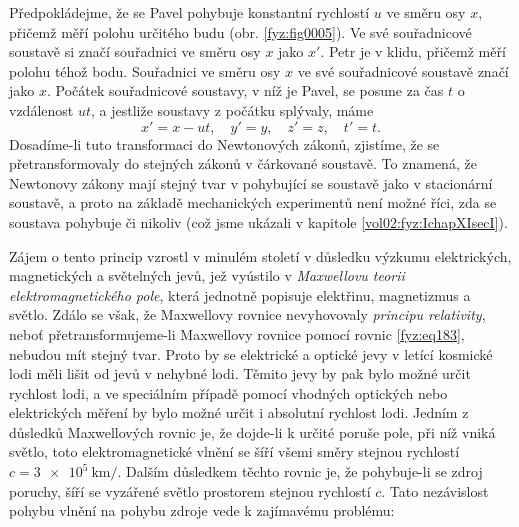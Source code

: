   
    Předpokládejme, že se Pavel pohybuje konstantní rychlostí \(u\) ve směru osy \(x\), přičemž měří
    polohu určitého budu (obr. \ref{fyz:fig0005}). Ve své souřadnicové soustavě si značí souřadnici
    ve směru osy \(x\) jako \(x'\). Petr je v klidu, přičemž měří polohu téhož bodu. Souřadnici ve
    směru osy \(x\) ve své souřadnicové soustavě značí jako \(x\). Počátek souřadnicové soustavy, v
    níž je Pavel, se posune za čas \(t\) o vzdálenost \(ut\), a jestliže soustavy z počátku
    splývaly, máme
    \begin{equation}\label{fyz:eq183}
      x' = x - ut, \quad y' = y, \quad z' = z, \quad t' = t. 
    \end{equation}
    Dosadíme-li tuto transformaci do Newtonových zákonů, zjistíme, že se přetransformovaly do
    stejných zákonů v čárkované soustavě. To znamená, že Newtonovy zákony mají stejný tvar v
    pohybující se soustavě jako v stacionární soustavě, a proto na základě mechanických experimentů
    není možné říci, zda se soustava pohybuje či nikoliv (což jsme ukázali v kapitole
    \ref{vol02:fyz:IchapXIsecI}). 
    
    Zájem o tento princip vzrostl v minulém století v důsledku výzkumu elektrických, magnetických a
    světelných jevů, jež vyústilo v \emph{Maxwellovu teorii elektromagnetického pole}, která
    jednotně popisuje elektřinu, magnetizmus a světlo. Zdálo se však, že Maxwellovy rovnice
    nevyhovovaly \emph{principu relativity}, neboť přetransformujeme-li Maxwellovy rovnice pomocí
    rovnic \ref{fyz:eq183}, nebudou mít stejný tvar. Proto by se elektrické a optické jevy v letící
    kosmické lodi měli lišit od jevů v nehybné lodi. Těmito jevy by pak bylo možné určit rychlost
    lodi, a ve speciálním případě pomocí vhodných optických nebo elektrických měření by bylo možné
    určit i absolutní rychlost lodi. Jedním z důsledků Maxwellových rovnic je, že dojde-li k určité
    poruše pole, při níž vniká světlo, toto elektromagnetické vlnění se šíří všemi směry stejnou
    rychlostí \(c = \SI{3e5}{\km\per}\). Dalším důsledkem těchto rovnic je, že pohybuje-li se zdroj
    poruchy, šíří se vyzářené světlo prostorem stejnou rychlostí \(c\). Tato nezávislost pohybu
    vlnění na pohybu zdroje vede k zajímavému problému:
    
